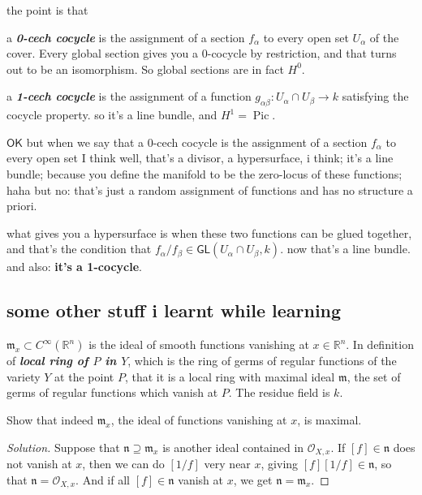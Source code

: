 the point is that

a \textit{\textbf{0-cech cocycle}} is the assignment of a section \(f_\alpha\) to every open set \(U_\alpha\) of the cover. Every global section gives you a \(0\)-cocycle by restriction, and that turns out to be an isomorphism. So global sections are in fact \(H^0\).

a  \textit{\textbf{1-cech cocycle}} is the assignment of a function \(g_{\alpha \beta}:U_\alpha \cap U_\beta \to k\) satisfying the cocycle property. so it's a line bundle, and \(H^1=\operatorname{Pic}\).

\begin{question}\leavevmode
\(\mathsf{OK}\) but when we say that a 0-cech cocycle is the assignment of a section \(f_\alpha\) to every open set I think well, that's a divisor, a hypersurface, i think; it's a line bundle; because you define the manifold to be the zero-locus of these functions; haha but no: that's just a random assignment of functions and has no structure a priori.

what gives you a hypersurface is when these two functions can be glued together, and that's the condition that \(f_\alpha/f_\beta \in \mathsf{GL}(U_\alpha \cap U_\beta,k)\). now that's a line bundle. and also: \textbf{it's a {\color{2}1}-cocycle}.
\end{question}

\subsection{some other stuff i learnt while learning}

\(\mathfrak{m}_x \subset C^\infty(\mathbb{R}^n)\) is the ideal of smooth functions vanishing at \(x \in \mathbb{R}^n\). In \cite{hart} definition of \textit{\textbf{local ring of \(P\) in \(Y\)}}, which is the ring of germs of regular functions of the variety \(Y\) at the point \(P\), that it is a local ring with maximal ideal \(\mathfrak{m}\), the set of germs of regular functions which vanish at \(P\). The residue field is \(k\).

\begin{exercise}\leavevmode
Show that indeed \(\mathfrak{m}_x\), the ideal of functions vanishing at \(x\), is maximal.
\end{exercise}
\begin{proof}[Solution]\leavevmode
	Suppose that \(\mathfrak{n} \supseteq \mathfrak{m}_x\) is another ideal contained in \(\mathcal{O}_{X,x}\). If \([f] \in \mathfrak{n}\) does not vanish at \(x\), then we can do \([1/f]\) very near  \(x\), giving \([f][1/f] \in \mathfrak{n}\), so that \(\mathfrak{n}=\mathcal{O}_{X,x}\). And if all \([f] \in \mathfrak{n}\) vanish at \(x\), we get \(\mathfrak{n}=\mathfrak{m}_x\).
\end{proof}

